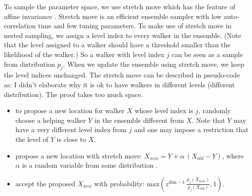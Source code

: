 \documentclass[letterpaper, preprint]{aastex}
\newcommand{\qer}[1]{{\color{red}#1}}
\begin{document}
To sample the parameter space, we use stretch move which has the feature of affine invariance \citep{goodman10a}. Stretch move is an efficient ensemble sampler with low auto-correlation time and few tuning parameters. To make use of stretch move in nested sampling, we assign a level index to every walker in the ensemble. (Note that the level assigned to a walker should have a threshold smaller than the likelihood of the walker.) So a walker with level index $j$ can be seen as a sample from distribution $p_j$. When we update the ensemble using stretch move, we keep the level indices unchanged. The stretch move can be described in pseudo-code as:
\qer{I didn't elaborate why it is ok to have walkers in different levels (different distribution). The proof takes too much space.}
\begin{sffamily}
\begin{itemize}
\item to propose a new location for walker $X$ whose level index is $j$, randomly choose a helping walker $Y$ in the ensemble different from $X$. Note that $Y$ may have a very different level index from $j$ and one may impose a restriction that the level of $Y$ is close to $X$.
\item propose a new location with stretch move: $X_{new} = Y + \alpha\, (X_{old}-Y)$, where $\alpha$ is a random variable from some distribution \citep{goodman10a}.
\item accept the proposed $X_{new}$ with probability: $\mathrm{max}\left(z^{\mathrm{dim}-1}\,\frac{p_{j}(X_{new})}{p_{j}(X_{old})},1\right)$. 
\end{itemize}
\end{sffamily}
\end{document}
